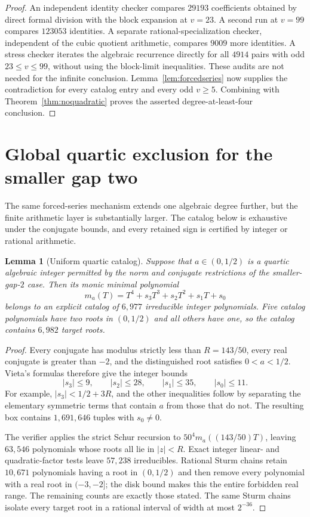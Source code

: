 \documentclass[11pt]{article}
\newtheorem{lemma}[theorem]{Lemma}
\theoremstyle{remark}
\numberwithin{equation}{section}
\begin{document}
\begin{proof}
An independent identity checker compares $29193$ coefficients obtained by
direct formal division with the block expansion at $v=23$.  A second run at
\mbox{$v=99$} compares $123053$ identities.  A separate rational-specialization
checker, independent of the cubic quotient arithmetic, compares $9009$ more
identities.  A stress checker iterates the algebraic recurrence directly for
all $4914$ pairs with odd $23\le v\le99$, without using the block-limit
inequalities.  These audits are not needed for the infinite conclusion.
Lemma~\ref{lem:forcedseries} now supplies the contradiction for every catalog
entry and every odd $v\ge5$.  Combining with
Theorem~\ref{thm:noquadratic} proves the asserted degree-at-least-four
conclusion.
\end{proof}

\section{Global quartic exclusion for the smaller gap two}
\label{sec:globalquartic}

The same forced-series mechanism extends one algebraic degree further, but the
finite arithmetic layer is substantially larger.  The catalog below is
exhaustive under the conjugate bounds, and every retained sign is certified by
integer or rational arithmetic.

\begin{lemma}[Uniform quartic catalog]\label{lem:quarticcatalog}
Suppose that $a\in(0,1/2)$ is a quartic algebraic integer permitted by the
norm and conjugate restrictions of the smaller-gap-$2$ case.  Then its monic
minimal polynomial
\[
 m_a(T)=T^4+s_3T^3+s_2T^2+s_1T+s_0
\]
belongs to an explicit catalog of $6{,}977$ irreducible integer polynomials.
Five catalog polynomials have two roots in $(0,1/2)$ and all others have one,
so the catalog contains $6{,}982$ target roots.
\end{lemma}
\begin{proof}
Every conjugate has modulus strictly less than $R=143/50$, every real
conjugate is greater than $-2$, and the distinguished root satisfies
$0<a<1/2$.  Vieta's formulas therefore give the integer bounds
\[
 |s_3|\le9,\qquad |s_2|\le28,\qquad |s_1|\le35,
 \qquad |s_0|\le11.
\]
For example, $|s_3|<1/2+3R$, and the other inequalities follow by separating
the elementary symmetric terms that contain $a$ from those that do not.  The
resulting box contains $1{,}691{,}646$ tuples with $s_0\ne0$.

The verifier applies the strict Schur recursion to
$50^4m_a((143/50)T)$, leaving $63{,}546$ polynomials whose roots all lie in
$|z|<R$.  Exact integer linear- and quadratic-factor tests leave $57{,}238$
irreducibles.  Rational Sturm chains retain $10{,}671$ polynomials having a
root in $(0,1/2)$ and then remove every polynomial with a real root in
$(-3,-2]$; the disk bound makes this the entire forbidden real range.  The
remaining counts are exactly those stated.  The same Sturm chains isolate
every target root in a rational interval of width at most $2^{-36}$.
\end{proof}
\end{document}
